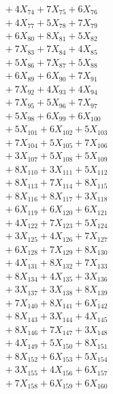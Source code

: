 \documentclass[a4paper,10pt]{article}
\begin{document}
{\begin{align}
&\;  + 4 X_{74} + 7 X_{75} + 6 X_{76} \\[0.3ex]
&\;  + 4 X_{77} + 5 X_{78} + 7 X_{79} \\[0.3ex]
&\;  + 6 X_{80} + 8 X_{81} + 5 X_{82} \\[0.3ex]
&\;  + 7 X_{83} + 7 X_{84} + 4 X_{85} \\[0.3ex]
&\;  + 5 X_{86} + 7 X_{87} + 5 X_{88} \\[0.3ex]
&\;  + 6 X_{89} + 6 X_{90} + 7 X_{91} \\[0.3ex]
&\;  + 7 X_{92} + 4 X_{93} + 4 X_{94} \\[0.3ex]
&\;  + 7 X_{95} + 5 X_{96} + 7 X_{97} \\[0.3ex]
&\;  + 5 X_{98} + 6 X_{99} + 6 X_{100} \\[0.5ex]\allowbreak
&\;  + 5 X_{101} + 6 X_{102} + 5 X_{103} \\[0.3ex]
&\;  + 7 X_{104} + 5 X_{105} + 7 X_{106} \\[0.3ex]
&\;  + 3 X_{107} + 5 X_{108} + 5 X_{109} \\[0.3ex]
&\;  + 8 X_{110} + 3 X_{111} + 5 X_{112} \\[0.3ex]
&\;  + 8 X_{113} + 7 X_{114} + 8 X_{115} \\[0.3ex]
&\;  + 8 X_{116} + 8 X_{117} + 3 X_{118} \\[0.3ex]
&\;  + 6 X_{119} + 6 X_{120} + 6 X_{121} \\[0.3ex]
&\;  + 4 X_{122} + 7 X_{123} + 5 X_{124} \\[0.3ex]
&\;  + 3 X_{125} + 4 X_{126} + 7 X_{127} \\[0.3ex]
&\;  + 6 X_{128} + 7 X_{129} + 8 X_{130} \\[0.5ex]\allowbreak
&\;  + 4 X_{131} + 8 X_{132} + 7 X_{133} \\[0.3ex]
&\;  + 8 X_{134} + 4 X_{135} + 3 X_{136} \\[0.3ex]
&\;  + 3 X_{137} + 3 X_{138} + 8 X_{139} \\[0.3ex]
&\;  + 7 X_{140} + 8 X_{141} + 6 X_{142} \\[0.3ex]
&\;  + 8 X_{143} + 3 X_{144} + 4 X_{145} \\[0.3ex]
&\;  + 8 X_{146} + 7 X_{147} + 3 X_{148} \\[0.3ex]
&\;  + 4 X_{149} + 5 X_{150} + 8 X_{151} \\[0.3ex]
&\;  + 8 X_{152} + 6 X_{153} + 5 X_{154} \\[0.3ex]
&\;  + 3 X_{155} + 4 X_{156} + 6 X_{157} \\[0.3ex]
&\;  + 7 X_{158} + 6 X_{159} + 6 X_{160} \\[0.5ex]\allowbreak

\end{align}}
\end{document}
